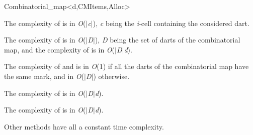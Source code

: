 \begin{ccRefClass}{Combinatorial_map<d,CMItems,Alloc>}

The complexity of  is in \emph{O}($|$\emph{c}$|$), \emph{c} being the
\emph{i}-cell containing the considered dart.

The complexity of  is in \emph{O}($|$\emph{D}$|$), 
\emph{D} being the set of darts of the combinatorial map, and the complexity of 
 is in \emph{O}($|$\emph{D}$|$\mytimes{}\emph{d}).

The complexity of  and  is in \emph{O}(1) if
all the darts of the combinatorial map have the same mark, and in
\emph{O}($|$\emph{D}$|$) otherwise.

The complexity of  is in
\emph{O}($|$\emph{D}$|$\mytimes{}\emph{d}).

The complexity of  is in \emph{O}($|$\emph{D}$|$\mytimes{}\emph{d}).

Other methods have all a constant time complexity.

\ccSeeAlso
{}\\
\\

\end{ccRefClass}
\ccRefPageEnd
